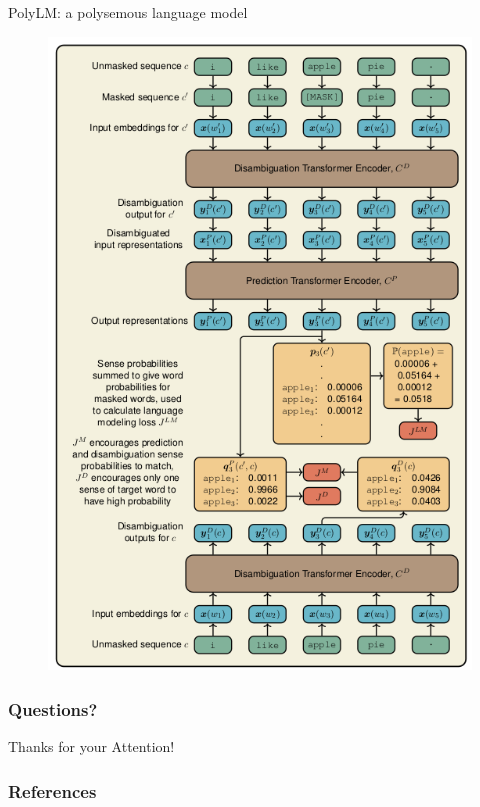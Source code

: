 \documentclass[handout]{beamer}
\begin{document}
\begin{frame}{PolyLM: a polysemous language model}

  \begin{figure}[h]
        	\includegraphics[scale = 0.29]{pics/polylm.png}
        \end{figure}


\end{frame}



\begin{frame}
\frametitle{Questions?}
\begin{center}\LARGE Thanks for your Attention!\\ \end{center}



\end{frame}

\begin{frame}[allowframebreaks]\scriptsize
\frametitle{References}


%
\end{frame}  


\end{document}
